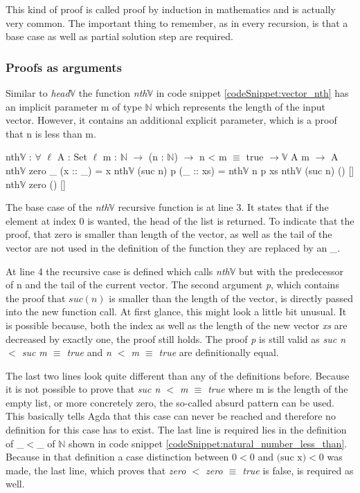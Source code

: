 This kind of proof is called proof by induction in mathematics and is actually very common.
The important thing to remember, as in every recursion, is that a base case as well as partial solution step are required.

\subsubsection{Proofs as arguments}

Similar to \emph{head$\mathbb{V}$} the function \emph{nth$\mathbb{V}$} in code snippet \ref{codeSnippet:vector_nth} has an implicit parameter m of type $\mathbb{N}$ which represents the length of the input vector. 
However, it contains an additional explicit parameter, which is a proof that n is less than m.

\begin{codesnippet}[mathescape=true, caption={Definition of \emph{nth} function in Agda}, label={codeSnippet:vector_nth}]
nth$\mathbb{V}$ : $\forall$ {$\ell$} {A : Set $\ell$} {m : $\mathbb{N}$} $\rightarrow$
       (n : $\mathbb{N}$) $\rightarrow$ n < m $\equiv$ true $\rightarrow \mathbb{V}$ A m $\rightarrow$ A
nth$\mathbb{V}$ zero _ (x :: _) = x
nth$\mathbb{V}$ (suc n) p (_ :: xs) = nth$\mathbb{V}$ n p xs
nth$\mathbb{V}$ (suc n) () []
nth$\mathbb{V}$ zero () []
\end{codesnippet}

The base case of the \emph{nth$\mathbb{V}$} recursive function is at line 3. It states that if the element at index 0 is wanted, the head of the list is returned.
To indicate that the proof, that zero is smaller than length of the vector, as well as the tail of the vector are not used in the definition of the function they are replaced by an \_.

At line 4 the recursive case is defined which calls \emph{nth$\mathbb{V}$} but with the predecessor of n and the tail of the current vector.
The second argument \emph{p}, which contains the proof that $suc(n)$ is smaller than the length of the vector, is directly passed into the new function call. 
At first glance, this might look a little bit unusual. 
It is possible because, both the index as well as the length of the new vector \emph{xs} are decreased by exactly one, the proof still holds.
The proof \emph{p} is still valid as \emph{suc n $<$ suc m $\equiv$ true} and \emph{n $<$ m $\equiv$ true} are definitionally equal.

The last two lines look quite different than any of the definitions before.
Because it is not possible to prove that \emph{suc n $<$ m $\equiv$ true} where m is the length of the empty list, or more concretely zero, the so-called absurd pattern can be used. 
This basically tells Agda that this case can never be reached and therefore no definition for this case has to exist.
The last line is required lies in the definition of \_$<$\_ of $\mathbb{N}$ shown in code snippet \ref{codeSnippet:natural_number_less_than}.
Because in that definition a case distinction between $0 < 0$ and $\text{(suc x)} < 0$ was made, the last line, which proves that \emph{zero $<$ zero $\equiv$ true} is false, is required as well.

